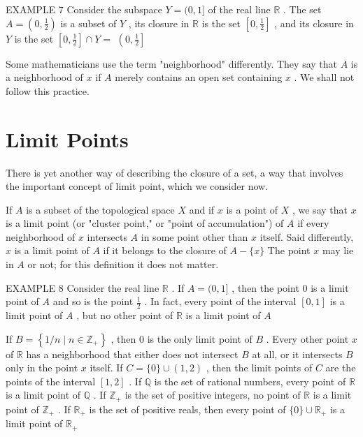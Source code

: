 EXAMPLE 7 Consider the subspace \(Y = (0,1\rbrack\) of the real line \(\mathbb{R}\) . The set \(A = \left( {0,\frac{1}{2}}\right)\) is a subset of \(Y\) , its closure in \(\mathbb{R}\) is the set \(\left\lbrack  {0,\frac{1}{2}}\right\rbrack\) , and its closure in \(Y\) is the set \(\left\lbrack  {0,\frac{1}{2}}\right\rbrack   \cap  Y =\)  \(\left( {0,\frac{1}{2}}\right\rbrack\)

Some mathematicians use the term "neighborhood" differently. They say that \(A\) is a neighborhood of \(x\) if \(A\) merely contains an open set containing \(x\) . We shall not follow this practice.

\section*{Limit Points}

There is yet another way of describing the closure of a set, a way that involves the important concept of limit point, which we consider now.

If \(A\) is a subset of the topological space \(X\) and if \(x\) is a point of \(X\) , we say that \(x\) is a limit point (or "cluster point," or "point of accumulation") of \(A\) if every neighborhood of \(x\) intersects \(A\) in some point other than \(x\) itself. Said differently, \(x\) is a limit point of \(A\) if it belongs to the closure of \(A - \{ x\}\) The point \(x\) may lie in \(A\) or not; for this definition it does not matter.

EXAMPLE 8 Consider the real line \(\mathbb{R}\) . If \(A = (0,1\rbrack\) , then the point 0 is a limit point of \(A\) and so is the point \(\frac{1}{2}\) . In fact, every point of the interval \(\left\lbrack  {0,1}\right\rbrack\) is a limit point of \(A\) , but no other point of \(\mathbb{R}\) is a limit point of \(A\)

If \(B = \left\{  {1/n \mid  n \in  {\mathbb{Z}}_{ + }}\right\}\) , then 0 is the only limit point of \(B\) . Every other point \(x\) of \(\mathbb{R}\) has a neighborhood that either does not intersect \(B\) at all, or it intersects \(B\) only in the point \(x\) itself. If \(C = \{ 0\}  \cup  \left( {1,2}\right)\) , then the limit points of \(C\) are the points of the interval \(\left\lbrack  {1,2}\right\rbrack\) . If \(\mathbb{Q}\) is the set of rational numbers, every point of \(\mathbb{R}\) is a limit point of \(\mathbb{Q}\) . If \({\mathbb{Z}}_{ + }\) is the set of positive integers, no point of \(\mathbb{R}\) is a limit point of \({\mathbb{Z}}_{ + }\) . If \({\mathbb{R}}_{ + }\) is the set of positive reals, then every point of \(\{ 0\}  \cup  {\mathbb{R}}_{ + }\) is a limit point of \({\mathbb{R}}_{ + }\)

